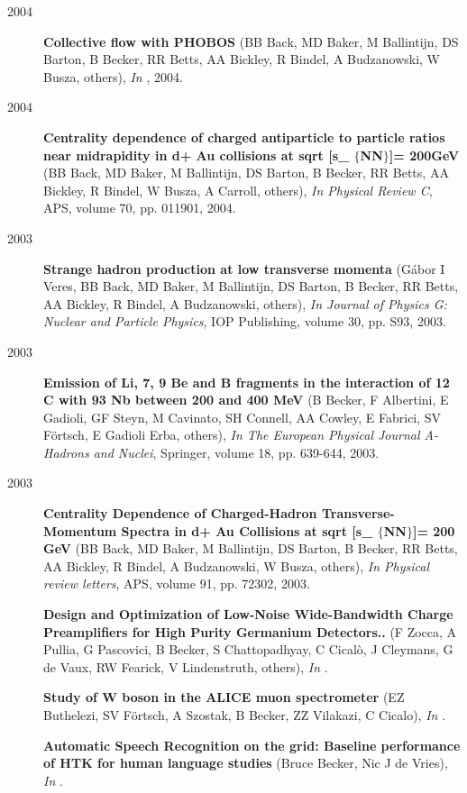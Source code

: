 \begin{description}
\item[2004]{\bf Collective flow with PHOBOS} (BB Back, MD Baker, M Ballintijn, DS Barton, B Becker, RR Betts, AA Bickley, R Bindel, A Budzanowski, W Busza, others), {\em In }, 2004.
\item[2004]{\bf Centrality dependence of charged antiparticle to particle ratios near midrapidity in d+ Au collisions at sqrt [s\_ $\{$NN$\}$]= 200GeV} (BB Back, MD Baker, M Ballintijn, DS Barton, B Becker, RR Betts, AA Bickley, R Bindel, W Busza, A Carroll, others), {\em In Physical Review C}, APS, volume 70, pp. 011901, 2004.
\item[2003]{\bf Strange hadron production at low transverse momenta} (Gábor I Veres, BB Back, MD Baker, M Ballintijn, DS Barton, B Becker, RR Betts, AA Bickley, R Bindel, A Budzanowski, others), {\em In Journal of Physics G: Nuclear and Particle Physics}, IOP Publishing, volume 30, pp. S93, 2003.
\item[2003]{\bf Emission of Li, 7, 9 Be and B fragments in the interaction of 12 C with 93 Nb between 200 and 400 MeV} (B Becker, F Albertini, E Gadioli, GF Steyn, M Cavinato, SH Connell, AA Cowley, E Fabrici, SV Förtsch, E Gadioli Erba, others), {\em In The European Physical Journal A-Hadrons and Nuclei}, Springer, volume 18, pp. 639-644, 2003.
\item[2003]{\bf Centrality Dependence of Charged-Hadron Transverse-Momentum Spectra in d+ Au Collisions at sqrt [s\_ $\{$NN$\}$]= 200 GeV} (BB Back, MD Baker, M Ballintijn, DS Barton, B Becker, RR Betts, AA Bickley, R Bindel, A Budzanowski, W Busza, others), {\em In Physical review letters}, APS, volume 91, pp. 72302, 2003.
\item[]{\bf Design and Optimization of Low-Noise Wide-Bandwidth Charge Preamplifiers for High Purity Germanium Detectors..} (F Zocca, A Pullia, G Pascovici, B Becker, S Chattopadhyay, C Cicalò, J Cleymans, G de Vaux, RW Fearick, V Lindenstruth, others), {\em In }.
\item[]{\bf Study of W boson in the ALICE muon spectrometer} (EZ Buthelezi, SV Förtsch, A Szostak, B Becker, ZZ Vilakazi, C Cicalo), {\em In }.
\item[]{\bf Automatic Speech Recognition on the grid: Baseline performance of HTK for human language studies} (Bruce Becker, Nic J de Vries), {\em In }.
\end{description}
